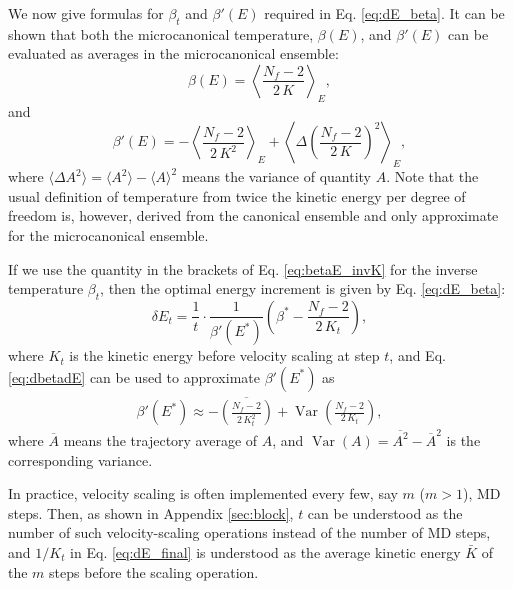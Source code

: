 \documentclass[reprint]{revtex4-1}
\begin{document}
We now give formulas for $\beta_t$
and $\beta'(E)$ required in Eq. \eqref{eq:dE_beta}.
%
It can be shown that both the microcanonical temperature, $\beta(E)$,
and $\beta'(E)$ can be evaluated as
averages in the microcanonical ensemble\cite{rugh1997, frenkel}:
%
\begin{equation}
  \beta(E)
  =
  \left\langle
    \frac{ N_f - 2 }
         { 2 \, K }
  \right\rangle_E
  ,
  \label{eq:betaE_invK}
\end{equation}
%
and
%
\begin{equation}
  \beta'(E)
  =
  - \left\langle
      \frac{ N_f - 2 }
           { 2 \, K^2 }
    \right\rangle_E
  + \left\langle
      \Delta\left(
        \frac{ N_f - 2 }
             { 2 \, K }
      \right)^2
    \right\rangle_E
  ,
  \label{eq:dbetadE}
\end{equation}
%
where
$\langle \Delta A^2 \rangle = \langle A^2 \rangle - \langle A \rangle^2$
means the variance of quantity $A$.
%
Note that the usual definition of temperature from twice the kinetic energy
per degree of freedom is, however,
derived from the canonical ensemble and
only approximate for the microcanonical ensemble.



If we use the quantity in the brackets of
Eq. \eqref{eq:betaE_invK} for the inverse temperature
$\beta_t$,
then the optimal energy increment is given by
Eq. \eqref{eq:dE_beta}:
%
\begin{equation}
\delta E_t
=
\frac{ 1 } { t } \cdot
\frac{ 1 } { \beta'(E^*) }
\left(
 \beta^* -
 \frac{ N_f - 2  }
      { 2 \, K_t }
\right)
,
\label{eq:dE_final}
\end{equation}
%
where
$K_t$ is the kinetic energy before velocity scaling at step $t$,
and
Eq. \eqref{eq:dbetadE} can be used to approximate
$\beta'(E^*)$ as
%
\begin{align}
  \beta'(E^*)
  \approx
  - \overline{
    \left(
      \frac{ N_f - 2 }
           { 2 \, K_t^2 }
    \right)
    }
    +
    \operatorname{Var}
    \left(
        \frac{ N_f - 2 }
             { 2 \, K_t }
    \right)
  ,
  \label{eq:dbeta}
\end{align}
%
where
$\overline A$ means the trajectory average of $A$,
and
$\operatorname{Var}(A) = \overline{ A^2 } - {\overline A}^2$
is the corresponding variance.

In practice, velocity scaling is often implemented every few,
say $m$ ($m > 1$), MD steps.
%
Then,
as shown in Appendix \ref{sec:block},
$t$ can be understood as the number of
such velocity-scaling operations instead of
the number of MD steps, and
$1/K_t$ in Eq. \eqref{eq:dE_final} is understood
as the average kinetic energy $\bar K$ of the $m$ steps
before the scaling operation.
\end{document}
